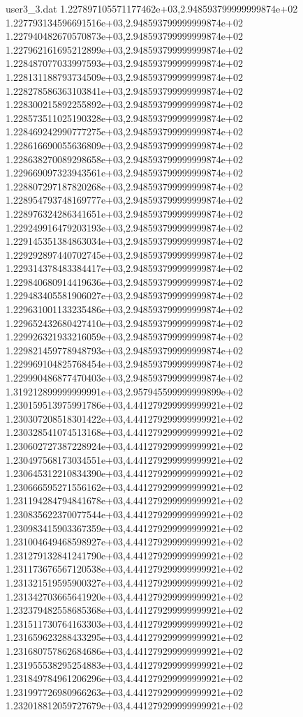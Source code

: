 \begin{filecontents}{user3_3.dat}
1.227897105571177462e+03,2.948593799999999874e+02
1.227793134596691516e+03,2.948593799999999874e+02
1.227940482670570873e+03,2.948593799999999874e+02
1.227962161695212899e+03,2.948593799999999874e+02
1.228487077033997593e+03,2.948593799999999874e+02
1.228131188793734509e+03,2.948593799999999874e+02
1.228278586363103841e+03,2.948593799999999874e+02
1.228300215892255892e+03,2.948593799999999874e+02
1.228573511025190328e+03,2.948593799999999874e+02
1.228469242990777275e+03,2.948593799999999874e+02
1.228616690055636809e+03,2.948593799999999874e+02
1.228638270089298658e+03,2.948593799999999874e+02
1.229669097323943561e+03,2.948593799999999874e+02
1.228807297187820268e+03,2.948593799999999874e+02
1.228954793748169777e+03,2.948593799999999874e+02
1.228976324286341651e+03,2.948593799999999874e+02
1.229249916479203193e+03,2.948593799999999874e+02
1.229145351384863034e+03,2.948593799999999874e+02
1.229292897440702745e+03,2.948593799999999874e+02
1.229314378483384417e+03,2.948593799999999874e+02
1.229840680914419636e+03,2.948593799999999874e+02
1.229483405581906027e+03,2.948593799999999874e+02
1.229631001133235486e+03,2.948593799999999874e+02
1.229652432680427410e+03,2.948593799999999874e+02
1.229926321933216059e+03,2.948593799999999874e+02
1.229821459778948793e+03,2.948593799999999874e+02
1.229969104825768454e+03,2.948593799999999874e+02
1.229990486877470403e+03,2.948593799999999874e+02
1.319212899999999991e+03,2.957945599999999899e+02
1.230159513975991786e+03,4.441279299999999921e+02
1.230307208518301422e+03,4.441279299999999921e+02
1.230328541074513168e+03,4.441279299999999921e+02
1.230602727387228924e+03,4.441279299999999921e+02
1.230497568173034551e+03,4.441279299999999921e+02
1.230645312210834390e+03,4.441279299999999921e+02
1.230666595271556162e+03,4.441279299999999921e+02
1.231194284794841678e+03,4.441279299999999921e+02
1.230835622370077544e+03,4.441279299999999921e+02
1.230983415903367359e+03,4.441279299999999921e+02
1.231004649468598927e+03,4.441279299999999921e+02
1.231279132841241790e+03,4.441279299999999921e+02
1.231173676567120538e+03,4.441279299999999921e+02
1.231321519595900327e+03,4.441279299999999921e+02
1.231342703665641920e+03,4.441279299999999921e+02
1.232379482558685368e+03,4.441279299999999921e+02
1.231511730764163303e+03,4.441279299999999921e+02
1.231659623288433295e+03,4.441279299999999921e+02
1.231680757862684686e+03,4.441279299999999921e+02
1.231955538295254883e+03,4.441279299999999921e+02
1.231849784961206296e+03,4.441279299999999921e+02
1.231997726980966263e+03,4.441279299999999921e+02
1.232018812059727679e+03,4.441279299999999921e+02

\end{filecontents}
